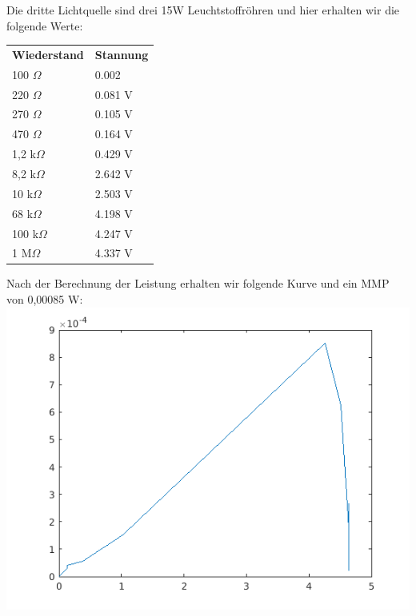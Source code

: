 \documentclass[a4paper,12pt]{article}
\begin{document}
\newline \newline
Die dritte Lichtquelle sind drei 15W Leuchtstoffröhren und hier erhalten wir die folgende Werte:\newline
 \begin{tabular}{ll}
  \textbf{Wiederstand} & \textbf{Stannung} \\
  100 $ \Omega $ & 0.002\\
  220 $ \Omega $ & 0.081 V\\
  270 $ \Omega $ & 0.105 V\\
  470 $ \Omega $ & 0.164 V\\
  1,2 k$ \Omega $ & 0.429 V\\
  8,2 k$ \Omega $ & 2.642 V \\
  10 k$ \Omega $ & 2.503 V \\
  68 k$ \Omega $ & 4.198 V \\
  100 k$ \Omega $ & 4.247 V \\
  1 M$ \Omega $ & 4.337 V \\
 \end{tabular}
Nach der Berechnung der Leistung erhalten wir folgende Kurve und ein MMP von 0,00085 W:\newline
\includegraphics{OSRAML6W640}
\newline \newline
\end{document}
